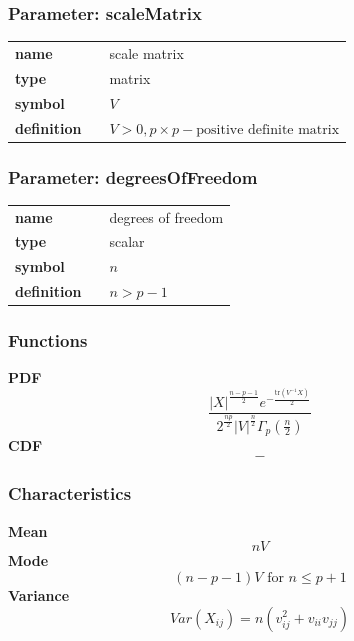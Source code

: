 \subsubsection*{Parameter: scaleMatrix}

\noindent\begin{tabular}{p{2cm}cl}
\textbf{name} & & scale matrix \\
\textbf{type} & & matrix \\
\textbf{symbol} & & $V$  \\
\textbf{definition} & & $V > 0, p\times p - \text{positive definite matrix}$
\end{tabular}
\subsubsection*{Parameter: degreesOfFreedom}

\noindent\begin{tabular}{p{2cm}cl}
\textbf{name} & & degrees of freedom \\
\textbf{type} & & scalar \\
\textbf{symbol} & & $n$  \\
\textbf{definition} & & $n > p-1$
\end{tabular}
\subsubsection*{Functions}

\smallskip \noindent \hspace{.2cm} \textbf{PDF} 
\begin{equation*}\frac{|X|^{\frac{n-p-1}{2}} e^{-\frac{\text{tr}(V^{-1}X)}{2}}}{2^\frac{np}{2}|V|^\frac{n}{2}\Gamma_p(\frac{n}{2})}\end{equation*}
\smallskip \noindent \hspace{.2cm} \textbf{CDF} 
\begin{equation*}-\end{equation*}
\smallskip
\subsubsection*{Characteristics}
\smallskip \noindent \hspace{.2cm} \textbf{Mean} 
\begin{equation*}n V\end{equation*}
\smallskip \noindent \hspace{.2cm} \textbf{Mode} 
\begin{equation*}(n-p-1) V \text{ for } n\leq p+1\end{equation*}
\smallskip \noindent \hspace{.2cm} \textbf{Variance} 
\begin{equation*}Var(X_{ij}) = n \left (v_{ij}^2+v_{ii}v_{jj} \right )\end{equation*}
\smallskip
